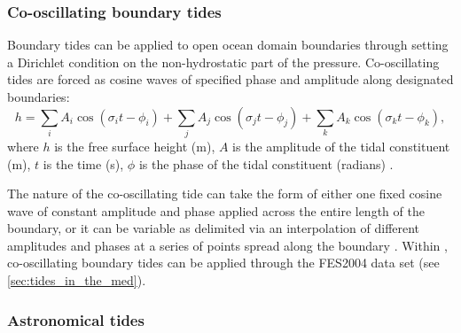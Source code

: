 \subsubsection{Co-oscillating boundary tides}
\label{sec:boundary_tide}

Boundary tides can be applied to open ocean domain boundaries through setting a Dirichlet condition on the non-hydrostatic part of the pressure. Co-oscillating tides are forced as cosine waves of specified phase and amplitude along designated boundaries:
\begin{equation}
h=\sum_{i}A_{i}\cos(\sigma_{i} t -\phi_{i})
+\sum_{j}A_{j}\cos(\sigma_{j} t -\phi_{j})
+\sum_{k}A_{k}\cos(\sigma_{k} t -\phi_{k}),
\label{eq:co-oscillating-tide}
\end{equation}
where $h$ is the free surface height (m), $A$ is the amplitude of the tidal
constituent (m), $t$ is the time (s), $\phi$ is the phase of the tidal constituent
(radians) \citep{Wells2008}.

The nature of the co-oscillating tide can take the form of either one fixed cosine wave of constant amplitude
and phase applied across the entire length of the boundary, or it can be variable as delimited via an
interpolation of different amplitudes and phases at a series of points spread along the boundary \citep{Wells2008}.
Within \fluidity, co-oscillating boundary tides can be applied through \eg the FES2004 data set (see \ref{sec:tides_in_the_med}).

\subsubsection{Astronomical tides}\label{sec:AST}
\label{astronomical}

